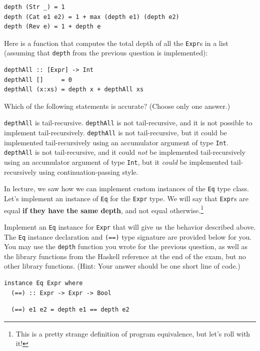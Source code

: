 \documentclass[addpoints]{exam}
\begin{document}
\begin{questions}
\begin{solutionorbox}[\stretch{1}]
\begin{verbatim}
depth (Str _) = 1
depth (Cat e1 e2) = 1 + max (depth e1) (depth e2)
depth (Rev e) = 1 + depth e
\end{verbatim}
\end{solutionorbox}

\newpage

\question[6] Here is a function that computes the total depth of all the \verb|Expr|s in a list (assuming that \verb|depth| from the previous question is implemented):

\begin{verbatim}
depthAll :: [Expr] -> Int
depthAll []     = 0
depthAll (x:xs) = depth x + depthAll xs
\end{verbatim}

Which of the following statements is accurate? (Choose only one answer.)

\begin{checkboxes}
  \choice \verb|depthAll| is tail-recursive.
  \choice \verb|depthAll| is not tail-recursive, and it is not possible to implement tail-recursively.
  \CorrectChoice \verb|depthAll| is not tail-recursive, but it could be implemented tail-recursively using an accumulator argument of type \verb|Int|.
  \choice \verb|depthAll| is not tail-recursive, and it could \emph{not} be implemented tail-recursively using an accumulator argument of type \verb|Int|, but it \emph{could} be implemented tail-recursively using continuation-passing style.
\end{checkboxes}

\question[6] In lecture, we saw how we can implement custom instances of the \texttt{Eq} type class.  Let's implement an instance of \texttt{Eq} for the \texttt{Expr} type.  We will say that \texttt{Expr}s are equal \textbf{if they have the same depth}, and not equal otherwise.\footnote{This is a pretty strange definition of program equivalence, but let's roll with it!}

Implement an \texttt{Eq} instance for \texttt{Expr} that will give us the behavior described above.  The \texttt{Eq} instance declaration and \texttt{(==)} type signature are provided below for you.  You may use the \texttt{depth} function you wrote for the previous question, as well as the library functions from the Haskell reference at the end of the exam, but no other library functions.  (Hint: Your answer should be one short line of code.)

\begin{verbatim}
instance Eq Expr where
  (==) :: Expr -> Expr -> Bool
\end{verbatim}
\begin{solutionorbox}[1in]
\begin{verbatim}  
  (==) e1 e2 = depth e1 == depth e2
\end{verbatim}
\end{solutionorbox}


\end{questions}
\end{document}
